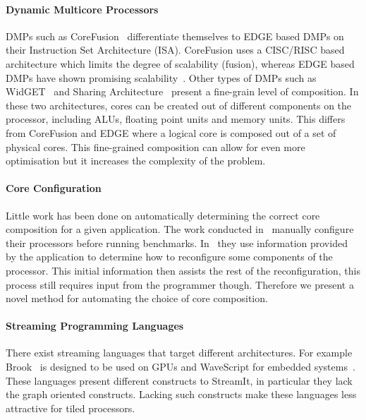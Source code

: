 \paragraph{Dynamic Multicore Processors}

DMPs such as CoreFusion~\cite{ipek2007CoreFusion} differentiate themselves to EDGE based DMPs on their Instruction Set Architecture (ISA).
CoreFusion uses a CISC/RISC based architecture which limits the degree of scalability (fusion), whereas EDGE based DMPs have shown promising scalability~\cite{kim2007composablelight, sibi2014}.
Other types of DMPs such as WidGET~\cite{Watanabe2010Widget} and Sharing Architecture~\cite{zhou2014sharingarch} present a fine-grain level of composition.
In these two architectures, cores can be created out of different components on the processor, including ALUs, floating point units and memory units.
This differs from CoreFusion and EDGE where a logical core is composed out of a set of physical cores.
This fine-grained composition can allow for even more optimisation but it increases the complexity of the problem.

\paragraph{Core Configuration}

Little work has been done on automatically determining the correct core composition for a given application.
The work conducted in~\cite{ipek2007CoreFusion,kim2007composablelight} manually configure their processors before running benchmarks.
In~\cite{santos2013nocdmc} they use information provided by the application to determine how to reconfigure some components of the processor.
This initial information then assists the rest of the reconfiguration, this process still requires input from the programmer though.
Therefore we present a novel method for automating the choice of core composition.  

\vspace{2mm}
\paragraph{Streaming Programming Languages}

There exist streaming languages that target different architectures.
For example Brook~\cite{buck2004brook} is designed to be used on GPUs and WaveScript for embedded systems~\cite{newton2008wavescript}.
These languages present different constructs to StreamIt, in particular they lack the graph oriented constructs. 
Lacking such constructs make these languages less attractive for tiled processors.

